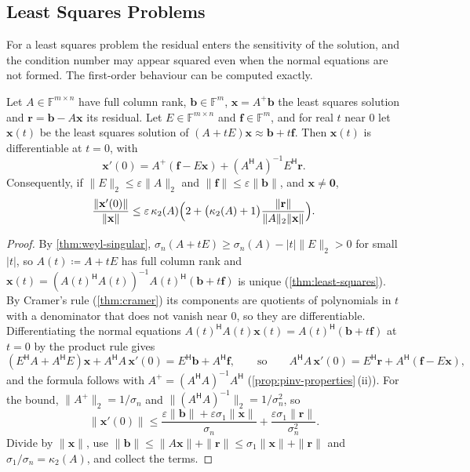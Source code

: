 \subsection{Least Squares Problems}

For a least squares problem the residual enters the sensitivity of the solution, and the condition number may appear squared even when the normal equations are not formed. The first-order behaviour can be computed exactly.

\begin{proposition}
\label{prop:ls-first-order}
Let $A\in\mathbb F^{m\times n}$ have full column rank, $\mathbf b\in\mathbb F^m$, $\mathbf x=A^+\mathbf b$ the least squares solution and $\mathbf r=\mathbf b-A\mathbf x$ its residual. Let $E\in\mathbb F^{m\times n}$ and $\mathbf f\in\mathbb F^m$, and for real $t$ near $0$ let $\mathbf x(t)$ be the least squares solution of $(A+tE)\mathbf x\approx\mathbf b+t\mathbf f$. Then $\mathbf x(t)$ is differentiable at $t=0$, with
\[
\mathbf x'(0)=A^+(\mathbf f-E\mathbf x)+(A^{\mathsf H}A)^{-1}E^{\mathsf H}\mathbf r .
\]
Consequently, if $\|E\|_2\le\varepsilon\|A\|_2$ and $\|\mathbf f\|\le\varepsilon\|\mathbf b\|$, and $\mathbf x\ne\mathbf 0$,
\[
\frac{\|\mathbf x'(0)\|}{\|\mathbf x\|}\le\varepsilon\,\kappa_2(A)\Bigl(2+\bigl(\kappa_2(A)+1\bigr)\frac{\|\mathbf r\|}{\|A\|_2\|\mathbf x\|}\Bigr).
\]
\end{proposition}

\begin{proof}
By \cref{thm:weyl-singular}, $\sigma_n(A+tE)\ge\sigma_n(A)-|t|\|E\|_2>0$ for small $|t|$, so $A(t)\coloneqq A+tE$ has full column rank and $\mathbf x(t)=(A(t)^{\mathsf H}A(t))^{-1}A(t)^{\mathsf H}(\mathbf b+t\mathbf f)$ is unique (\cref{thm:least-squares}). By Cramer's rule (\cref{thm:cramer}) its components are quotients of polynomials in $t$ with a denominator that does not vanish near $0$, so they are differentiable. Differentiating the normal equations $A(t)^{\mathsf H}A(t)\mathbf x(t)=A(t)^{\mathsf H}(\mathbf b+t\mathbf f)$ at $t=0$ by the product rule gives
\[
(E^{\mathsf H}A+A^{\mathsf H}E)\mathbf x+A^{\mathsf H}A\,\mathbf x'(0)=E^{\mathsf H}\mathbf b+A^{\mathsf H}\mathbf f,
\qquad\text{so}\qquad
A^{\mathsf H}A\,\mathbf x'(0)=E^{\mathsf H}\mathbf r+A^{\mathsf H}(\mathbf f-E\mathbf x),
\]
and the formula follows with $A^+=(A^{\mathsf H}A)^{-1}A^{\mathsf H}$ (\cref{prop:pinv-properties}\,(ii)). For the bound, $\|A^+\|_2=1/\sigma_n$ and $\|(A^{\mathsf H}A)^{-1}\|_2=1/\sigma_n^2$, so
\[
\|\mathbf x'(0)\|\le\frac{\varepsilon\|\mathbf b\|+\varepsilon\sigma_1\|\mathbf x\|}{\sigma_n}+\frac{\varepsilon\sigma_1\|\mathbf r\|}{\sigma_n^2}.
\]
Divide by $\|\mathbf x\|$, use $\|\mathbf b\|\le\|A\mathbf x\|+\|\mathbf r\|\le\sigma_1\|\mathbf x\|+\|\mathbf r\|$ and $\sigma_1/\sigma_n=\kappa_2(A)$, and collect the terms.
\end{proof}

